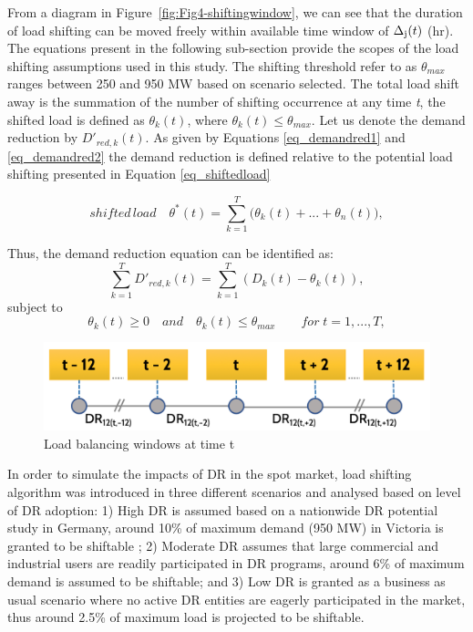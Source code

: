 \documentclass{pasa}%
\begin{document}
From a diagram in Figure~\ref{fig:Fig4-shiftingwindow}, we can see that the duration of load shifting can be moved freely within available time window of $\Delta \textsubscript{j} (t)$ (hr). The equations present in the following sub-section provide the scopes of the load shifting assumptions used in this study. The shifting threshold refer to as $\theta_{max}$ ranges between 250 and 950 MW based on scenario selected. The total load shift away is the summation of the number of shifting occurrence at any time \textit{t}, the shifted load is defined as $\theta_k (t)$, where $\theta_k (t) \leq \theta_{max}$. Let us denote the demand reduction by $D'_{red,k} (t)$. As given by Equations \ref{eq_demandred1} and \ref{eq_demandred2} the demand reduction is defined relative to the potential load shifting presented in Equation \ref{eq_shiftedload}

\begin{equation}\label{eq_shiftedload}
shifted \, load\quad \theta^* (t) = \sum_{k=1}^{T} \big( \theta_k (t) + ... + \theta_n (t) \big),
\end{equation}

Thus, the demand reduction equation can be identified as:
\begin{equation}\label{eq_demandred1}
\sum_{k=1}^{T} D'_{red,k} (t) = \sum_{k=1}^{T} (D_k (t) - \theta_k (t)),
\end{equation}
subject to 
\begin{equation}\label{eq_demandred2}
\theta_k (t) \geq 0 \quad and \quad \theta_k (t) \leq \theta_{max} \qquad for \; t = 1,...,T,
\end{equation}

\begin{figure}
\begin{center}
\includegraphics[width=.8\textwidth,height=.5\textheight,keepaspectratio]{DR/PASA_example/Figures_DR/DRtimes1.png}
\caption{Load balancing windows at time t}\label{fig:Fig-shiftingwindow}
\end{center}
\end{figure}


In order to simulate the impacts of DR in the spot market, load shifting algorithm was introduced in three different scenarios and analysed based on level of DR adoption: 1) High DR is assumed based on a nationwide DR potential study in Germany, around 10\% of maximum demand (950 MW) in Victoria is granted to be shiftable \cite{klobasa2009}; 2) Moderate DR assumes that large commercial and industrial users are readily participated in DR programs, around 6\% of maximum demand is assumed to be shiftable; and 3) Low DR is granted as a business as usual scenario where no active DR entities are eagerly participated in the market, thus around 2.5\% of maximum load is projected to be shiftable.
\end{document}

